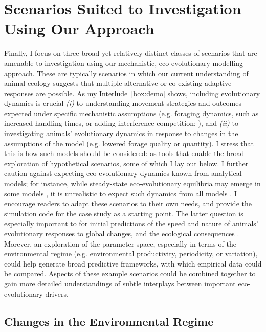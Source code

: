 \section*{Scenarios Suited to Investigation Using Our Approach}


Finally, I focus on three broad yet relatively distinct classes of scenarios that are amenable to investigation using our mechanistic, eco-evolutionary modelling approach.
These are typically scenarios in which our current understanding of animal ecology suggests that multiple alternative or co-existing adaptive responses are possible.
As my Interlude~\ref{box:demo} shows, including evolutionary dynamics is crucial \textit{(i)} to understanding movement strategies and outcomes expected under specific mechanistic assumptions (e.g. foraging dynamics, such as increased handling times, or adding interference competition: \cite{keddy2001}), and \textit{(ii)} to investigating animals' evolutionary dynamics in response to changes in the assumptions of the model (e.g. lowered forage quality or quantity).
I stress that this is how such models should be considered: as tools that enable the broad exploration of hypothetical scenarios, some of which I lay out below.
I further caution against expecting eco-evolutionary dynamics known from analytical models; for instance, while steady-state eco-evolutionary equilibria may emerge in some models \parencite[e.g.][]{gupte2021a,gupte2022c,getz2015,getz2016}, it is unrealistic to expect such dynamics from all models \parencite[see e.g.][]{netz2021}.
I encourage readers to adapt these scenarios to their own needs, and provide the simulation code for the case study as a starting point.
The latter question is especially important to for initial predictions of the speed and nature of animals' evolutionary responses to global changes, and the ecological consequences \parencite{bonnet2022,botero2015}.
Morever, an exploration of the parameter space, especially in terms of the environmental regime (e.g. environmental productivity, periodicity, or variation), could help generate broad predictive frameworks, with which empirical data could be compared.
Aspects of these example scenarios could be combined together to gain more detailed understandings of subtle interplays between important eco-evolutionary drivers.

\subsection*{Changes in the Environmental Regime}

